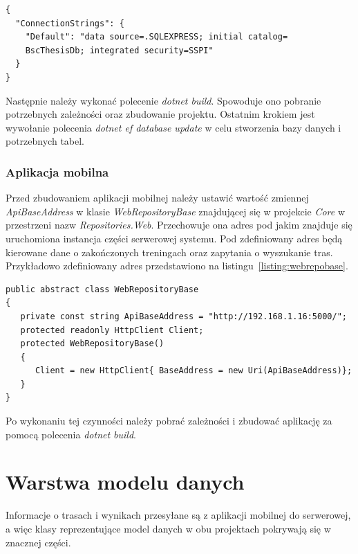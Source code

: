 \begin{lstlisting}[caption={Plik konfiguracyjny aplikacji serwerowej},label=listing:appsettings]
{
  "ConnectionStrings": {
    "Default": "data source=.SQLEXPRESS; initial catalog=
    BscThesisDb; integrated security=SSPI"
  }
}
\end{lstlisting}

Następnie należy wykonać polecenie \textit{dotnet build}. Spowoduje ono pobranie potrzebnych zależności oraz zbudowanie projektu. Ostatnim krokiem jest wywołanie polecenia \textit{dotnet ef database update} w celu stworzenia bazy danych i potrzebnych tabel.

\subsubsection{Aplikacja mobilna}
Przed zbudowaniem aplikacji mobilnej należy ustawić wartość zmiennej \textit{ApiBaseAddress} w klasie \textit{WebRepositoryBase} znajdującej się w projekcie \textit{Core} w przestrzeni nazw \textit{Repositories.Web}. Przechowuje ona adres pod jakim znajduje się uruchomiona instancja części serwerowej systemu. Pod zdefiniowany adres będą kierowane dane o zakończonych treningach oraz zapytania o wyszukanie tras. Przykładowo zdefiniowany adres przedstawiono na listingu~\ref{listing:webrepobase}.

\begin{lstlisting}[caption={Klasa zawierająca adres aplikacji serwerowej},label=listing:webrepobase]
public abstract class WebRepositoryBase
{
   private const string ApiBaseAddress = "http://192.168.1.16:5000/";
   protected readonly HttpClient Client;
   protected WebRepositoryBase()
   {
      Client = new HttpClient{ BaseAddress = new Uri(ApiBaseAddress)};
   }
}
\end{lstlisting}

Po wykonaniu tej czynności należy pobrać zależności i zbudować aplikację za pomocą polecenia \textit{dotnet build}.


\section{Warstwa modelu danych}
Informacje o trasach i wynikach przesyłane są z aplikacji mobilnej do serwerowej, a więc klasy reprezentujące model danych w obu projektach pokrywają się w znacznej części.

